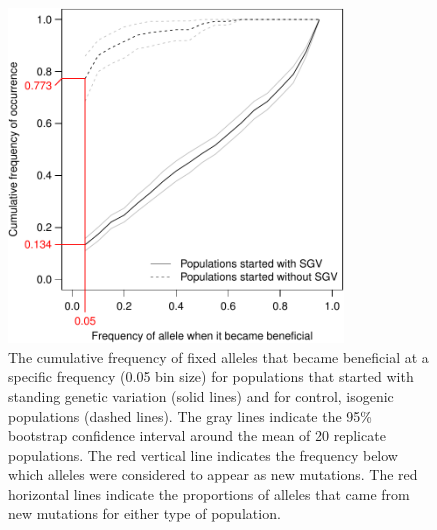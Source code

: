 \begin{doublespace}
\begin{figure}[t!]
\begin{center}
\includegraphics[width=3.5in]{cumul-freq-plot.pdf}
\caption{The cumulative frequency of fixed alleles
  that became beneficial at a specific frequency (0.05 bin size)
  for populations that started with standing genetic variation (solid lines)
  and for control, isogenic populations (dashed lines).
  The gray lines indicate the 95\% bootstrap confidence interval
  around the mean of 20 replicate populations.
  The red vertical line indicates the frequency
  below which alleles were considered to appear as new mutations.
  The red horizontal lines indicate the proportions
  of alleles that came from new mutations
  for either type of population.}
\label{cumul-freq-plot}
\end{center}
\end{figure}



\end{doublespace}
